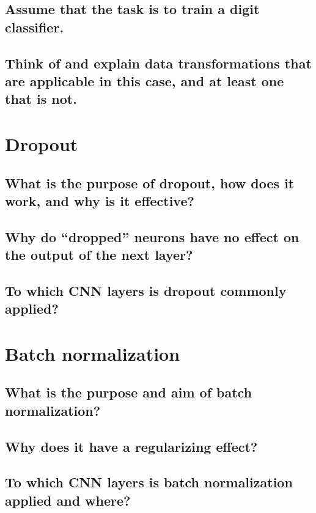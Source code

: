 \subsection{Assume that the task is to train a digit classifier.}

\subsection{Think of and explain data transformations that are applicable in this case, and at least one that is not.}

\section{Dropout}

\subsection{What is the purpose of dropout, how does it work, and why is it effective?}

\subsection{Why do “dropped” neurons have no effect on the output of the next layer?}

\subsection{To which CNN layers is dropout commonly applied?}

\section{Batch normalization}

\subsection{What is the purpose and aim of batch normalization?}

\subsection{Why does it have a regularizing effect?}

\subsection{To which CNN layers is batch normalization applied and where?}

